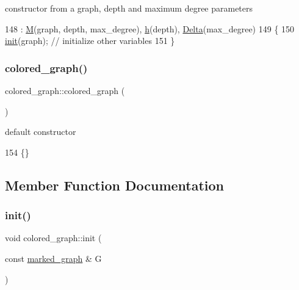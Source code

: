 constructor from a graph, depth and maximum degree parameters 


\begin{DoxyCode}
148                                                                     : \hyperlink{classcolored__graph_ab72c568fe12f7c849ca6bffb145aec47}{M}(graph, depth, max\_degree), 
      \hyperlink{classcolored__graph_ae27062a4ee59df2670d3a0c81e85a3fa}{h}(depth), \hyperlink{classcolored__graph_a5b0e93eb40a20dc815c809dee11edc12}{Delta}(max\_degree)
149   \{
150     \hyperlink{classcolored__graph_a0e867afa9f5491dfc05bed10680f0709}{init}(graph); \textcolor{comment}{// initialize other variables }
151   \}
\end{DoxyCode}
\mbox{\label{classcolored__graph_a104bcd930e68c04e4786678923bfdca1}} 
\subsubsection{\texorpdfstring{colored\+\_\+graph()}{colored\_graph()}\hspace{0.1cm}{\footnotesize\ttfamily [2/2]}}
{\footnotesize\ttfamily colored\+\_\+graph\+::colored\+\_\+graph (\begin{DoxyParamCaption}{ }\end{DoxyParamCaption})\hspace{0.3cm}{\ttfamily [inline]}}



default constructor 


\begin{DoxyCode}
154 \{\}
\end{DoxyCode}


\subsection{Member Function Documentation}
\mbox{\label{classcolored__graph_a0e867afa9f5491dfc05bed10680f0709}} 
\subsubsection{\texorpdfstring{init()}{init()}}
{\footnotesize\ttfamily void colored\+\_\+graph\+::init (\begin{DoxyParamCaption}\item[{const \hyperlink{classmarked__graph}{marked\+\_\+graph} \&}]{G }\end{DoxyParamCaption})}



